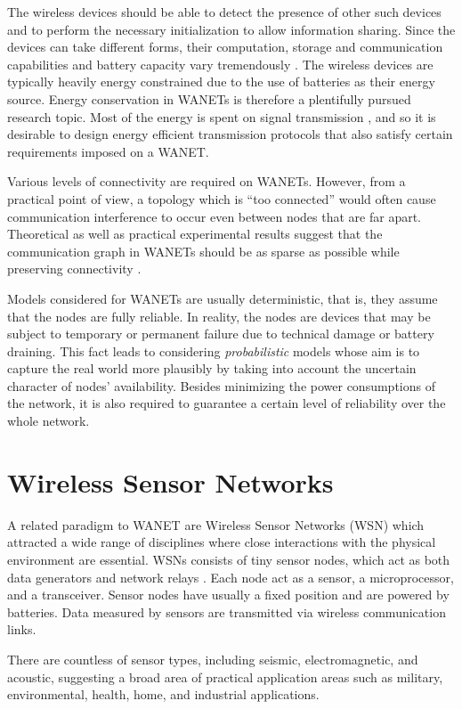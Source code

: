 The wireless devices should be able to detect the presence of other such devices and to perform the necessary initialization to allow information sharing.
Since the devices can take different forms, their computation, storage and communication capabilities and battery capacity vary tremendously \cite{toh01}.
The wireless devices are typically heavily energy constrained due to the use of batteries as their energy source.
Energy conservation in WANETs is therefore a plentifully pursued research topic.
Most of the energy is spent on signal transmission \cite{halgamuge09}, 
and so it is desirable to design energy efficient transmission protocols that also satisfy certain requirements imposed on a WANET.

Various levels of connectivity are required on WANETs.
However, from a practical point of view, a topology which is ``too connected'' would often cause communication interference to occur even between nodes that are far apart.
Theoretical as well as practical experimental results suggest that the communication graph in WANETs should be as sparse as possible while preserving connectivity \cite{blough02}.

Models considered for WANETs are usually deterministic, that is, they assume that the nodes are fully reliable. 
In reality, the nodes are devices that may be subject to temporary or permanent failure due to technical damage or battery draining.
This fact leads to considering \emph{probabilistic} models whose aim is to capture the real world more plausibly by taking into account the uncertain character of nodes' availability.
Besides minimizing the power consumptions of the network, it is also required to guarantee a certain level of reliability over the whole network.

\section{Wireless Sensor Networks}

A related paradigm to WANET are Wireless Sensor Networks (WSN) which attracted a wide range of disciplines where close interactions with the physical environment are essential.
WSNs consists of tiny sensor nodes, which act as both data generators and network relays \cite{akyildiz10}.
Each node act as a sensor, a microprocessor, and a transceiver.
Sensor nodes have usually a fixed position and are powered by batteries.
Data measured  by sensors are transmitted via wireless communication links.

There are countless of sensor types, including seismic, electromagnetic, and acoustic, suggesting a broad area of practical application areas such as 
military, environmental, health, home, and industrial applications.

